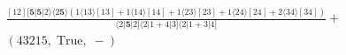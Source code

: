 \documentclass[varwidth, border=5pt]{standalone}
\begin{document}
\begin{my}
$\begin{gathered}
\scriptscriptstyle\frac{[12][𝟓|𝟓|2⟩⟨2𝟓⟩(1⟨13⟩[13]+1⟨14⟩[14]+1⟨23⟩[23]+1⟨24⟩[24]+2⟨34⟩[34])}{⟨2|𝟓|2]⟨2|1+4|3]⟨2|1+3|4]} +\\
\scriptscriptstyle(43215,\;\text{True},\;-) \phantom{+}
\end{gathered}$
\end{my}
\end{document}
